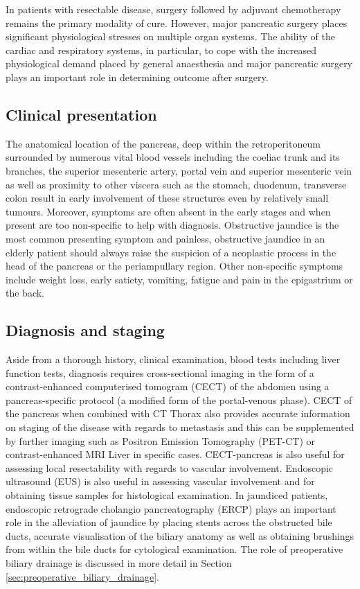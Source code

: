 In patients with resectable disease, surgery \parencite{sener_pancreatic_1999, sohn_resected_2000,geer_prognostic_1993} followed by adjuvant chemotherapy \parencite{neoptolemos_randomized_2004, neoptolemos_adjuvant_2009} remains the primary modality of cure. However, major pancreatic surgery places significant physiological stresses on multiple organ systems. The ability of the cardiac and respiratory systems, in particular, to cope with the increased physiological demand placed by general anaesthesia and major pancreatic surgery plays an important role in determining outcome after surgery.

\subsection{Clinical presentation}

The anatomical location of the pancreas, deep within the retroperitoneum surrounded by numerous vital blood vessels including the coeliac trunk and its branches, the superior mesenteric artery, portal vein and superior mesenteric vein as well as proximity to other viscera such as the stomach, duodenum, transverse colon result in early involvement of these structures even by relatively small tumours. Moreover, symptoms are often absent in the early stages and when present are too non-specific to help with diagnosis. Obstructive jaundice is the most common presenting symptom and painless, obstructive jaundice in an elderly patient should always raise the suspicion of a neoplastic process in the head of the pancreas or the periampullary region. Other non-specific symptoms include weight loss, early satiety, vomiting, fatigue and pain in the epigastrium or the back. 
 
\subsection{Diagnosis and staging}

Aside from a thorough history, clinical examination, blood tests including liver function tests, diagnosis requires cross-sectional imaging in the form of a contrast-enhanced computerised tomogram (CECT) of the abdomen using a pancreas-specific protocol (a modified form of the portal-venous phase). CECT of the pancreas when combined with CT Thorax also provides accurate information on staging of the disease with regards to metastasis and this can be supplemented by further imaging such as Positron Emission Tomography (PET-CT) or contrast-enhanced MRI Liver in specific cases. CECT-pancreas is also useful for assessing local resectability with regards to vascular involvement. Endoscopic ultrasound (EUS) is also useful in assessing vascular involvement and for obtaining tissue samples for histological examination. In jaundiced patients, endoscopic retrograde cholangio pancreatography (ERCP) plays an important role in the alleviation of jaundice by placing stents across the obstructed bile ducts, accurate visualisation of the biliary anatomy as well as obtaining brushings from within the bile ducts for cytological examination. The role of preoperative biliary drainage is discussed in more detail in Section \ref{sec:preoperative_biliary_drainage}.
	
